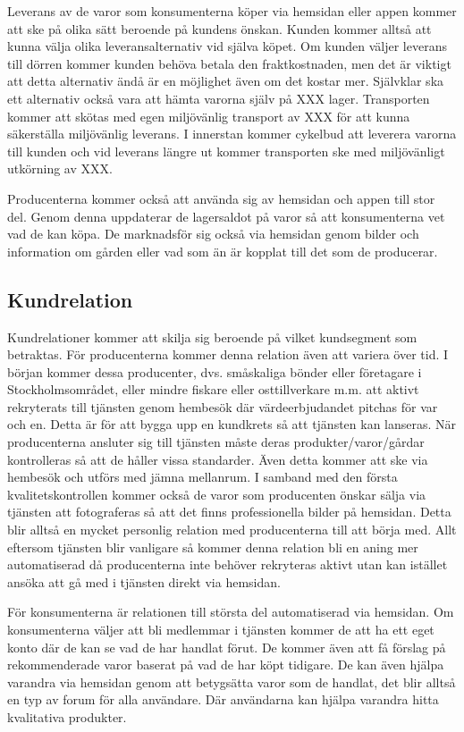 \documentclass[10pt,a4paper,oneside]{article}
\begin{document}
Leverans av de varor som konsumenterna köper via  hemsidan eller appen kommer att ske på olika sätt beroende på kundens önskan. Kunden kommer alltså att kunna välja olika leveransalternativ vid själva köpet. Om kunden väljer leverans till dörren kommer kunden behöva betala den fraktkostnaden, men det är viktigt att detta alternativ ändå är en möjlighet även om det kostar mer. Självklar ska ett alternativ också vara att hämta varorna själv på XXX lager. Transporten kommer att skötas med egen miljövänlig transport av XXX för att kunna säkerställa miljövänlig leverans. I innerstan kommer cykelbud att leverera varorna till kunden och vid leverans längre ut kommer transporten ske med miljövänligt utkörning av XXX.

Producenterna kommer också att använda sig av hemsidan och appen till stor del. Genom denna uppdaterar de lagersaldot på varor så att konsumenterna vet vad de kan köpa. De marknadsför sig också via hemsidan genom bilder och information om gården eller vad som än är kopplat till det som de producerar. 


\subsection{Kundrelation}
Kundrelationer kommer att skilja sig beroende på vilket kundsegment som betraktas. För producenterna kommer denna relation även att variera över tid. I början kommer dessa producenter, dvs. småskaliga bönder eller företagare i Stockholmsområdet, eller mindre fiskare eller osttillverkare m.m. att aktivt rekryterats till tjänsten genom hembesök där värdeerbjudandet pitchas för var och en. Detta är för att bygga upp en kundkrets så att tjänsten kan lanseras. När producenterna ansluter sig till tjänsten måste deras produkter/varor/gårdar kontrolleras så att de håller vissa standarder. Även detta kommer att ske via hembesök och utförs med jämna mellanrum. I samband med den första kvalitetskontrollen kommer också de varor som producenten önskar sälja via tjänsten att fotograferas så att det finns professionella bilder på hemsidan. Detta blir alltså en mycket personlig relation med producenterna till att börja med. Allt eftersom tjänsten blir vanligare så kommer denna relation bli en aning mer automatiserad då producenterna inte behöver rekryteras aktivt utan kan istället ansöka att gå med i tjänsten direkt via hemsidan. 

För konsumenterna är relationen till största del automatiserad via hemsidan. Om konsumenterna väljer att bli medlemmar i tjänsten kommer de att ha ett eget konto där de kan se vad de har handlat förut. De kommer även att få förslag på rekommenderade varor baserat på vad de har köpt tidigare. De kan även hjälpa varandra via hemsidan genom att betygsätta varor som de handlat, det blir alltså en typ av forum för alla användare. Där användarna kan hjälpa varandra hitta kvalitativa produkter. 
\end{document}
